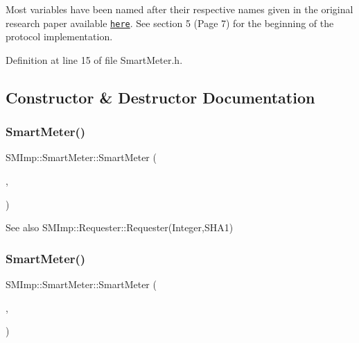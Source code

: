 Most variables have been named after their respective names given in the original research paper available \href{https://www.researchgate.net/publication/305077004_Secure_and_efficient_protection_of_consumer_privacy_in_Advanced_Metering_Infrastructure_supporting_fine-grained_data_analysis}{\tt here}. See section 5 (Page 7) for the beginning of the protocol implementation. 

Definition at line 15 of file Smart\+Meter.\+h.



\subsection{Constructor \& Destructor Documentation}
\mbox{\label{classSMImp_1_1SmartMeter_ac677ae1800bcd36e4d599cf3e65463b4}} 
\subsubsection{\texorpdfstring{Smart\+Meter()}{SmartMeter()}\hspace{0.1cm}{\footnotesize\ttfamily [1/3]}}
{\footnotesize\ttfamily S\+M\+Imp\+::\+Smart\+Meter\+::\+Smart\+Meter (\begin{DoxyParamCaption}\item[{Integer}]{,  }\item[{Crypto\+P\+P\+::\+S\+H\+A1 $\ast$}]{ }\end{DoxyParamCaption})}

\begin{DoxySeeAlso}{See also}
S\+M\+Imp\+::\+Requester\+::\+Requester(\+Integer,\+S\+H\+A1) 
\end{DoxySeeAlso}
\mbox{\label{classSMImp_1_1SmartMeter_acadde39bc15942aae2dceb2b4c8c654f}} 
\subsubsection{\texorpdfstring{Smart\+Meter()}{SmartMeter()}\hspace{0.1cm}{\footnotesize\ttfamily [2/3]}}
{\footnotesize\ttfamily S\+M\+Imp\+::\+Smart\+Meter\+::\+Smart\+Meter (\begin{DoxyParamCaption}\item[{Integer}]{,  }\item[{\+::\hyperlink{classSMAdapter}{S\+M\+Adapter} $\ast$}]{ }\end{DoxyParamCaption})}

